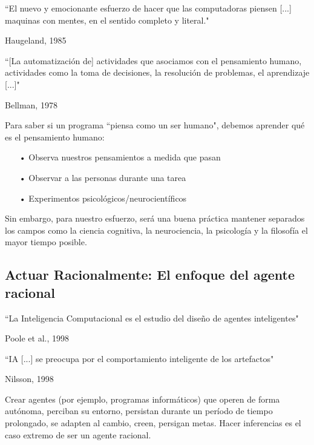\documentclass[12pt,a4paper]{book}
\begin{document}
\begin{blockquote}
``El nuevo y emocionante esfuerzo de hacer que las computadoras piensen [...] maquinas con mentes, en el sentido completo y literal."

\noindent\hfill
Haugeland, 1985
\end{blockquote}
\bigskip

\begin{blockquote}
``[La automatización de] actividades que asociamos con el pensamiento humano, actividades como la toma de decisiones, la resolución de problemas, el aprendizaje [...]"

\noindent\hfill
Bellman, 1978
\end{blockquote}
\bigskip
Para saber si un programa ``piensa como un ser humano", debemos aprender qué es el pensamiento humano:
\begin{enumerate}
\item[•] Observa nuestros pensamientos a medida que pasan
\item[•] Observar a las personas durante una tarea
\item[•] Experimentos psicológicos/neurocientíficos
\end{enumerate}
Sin embargo, para nuestro esfuerzo, será una buena práctica mantener separados los campos como la ciencia cognitiva, la neurociencia, la psicología y la filosofía el mayor tiempo posible.
\subsection{Actuar Racionalmente: El enfoque del agente racional}

\begin{blockquote}
``La Inteligencia Computacional es el estudio del diseño de agentes inteligentes"

\noindent\hfill
Poole et al., 1998
\end{blockquote}
\bigskip

\begin{blockquote}
``IA [...] se preocupa por el comportamiento inteligente de los artefactos"

\noindent\hfill
Nilsson, 1998
\end{blockquote}
\bigskip

Crear agentes (por ejemplo, programas informáticos) que operen de forma autónoma, perciban su entorno, persistan durante un período de tiempo prolongado, se adapten al cambio, creen,  persigan metas. Hacer inferencias es el caso extremo de ser un agente racional.\bigskip
\end{document}
